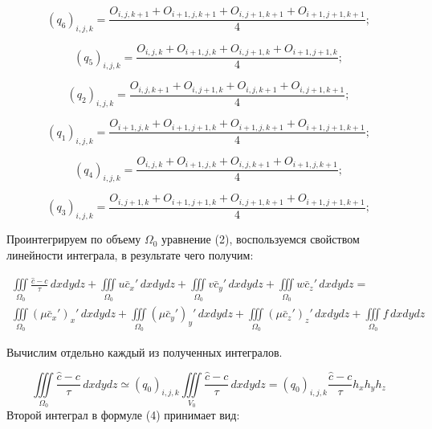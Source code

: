 \documentclass[12pt]{article}
\begin{document}
\begin{equation*}
 (q_6)_{i,j,k}=\frac{O_{i,j,k+1}+O_{i+1,j,k+1}+O_{i,j+1,k+1}+O_{i+1,j+1,k+1}}{4};
\end{equation*}

\begin{equation*}
(q_5)_{i,j,k}=\frac{O_{i,j,k}+O_{i+1,j,k}+O_{i,j+1,k}+O_{i+1,j+1,k}}{4};
\end{equation*}

\begin{equation*}
(q_2)_{i,j,k}=\frac{O_{i,j,k+1}+O_{i,j+1,k}+O_{i,j,k+1}+O_{i,j+1,k+1}}{4};
\end{equation*}

\begin{equation*}
(q_1)_{i,j,k}=\frac{O_{i+1,j,k}+O_{i+1,j+1,k}+O_{i+1,j,k+1}+O_{i+1,j+1,k+1}}{4};
\end{equation*}

\begin{equation*}
(q_4)_{i,j,k}=\frac{O_{i,j,k}+O_{i+1,j,k}+O_{i,j,k+1}+O_{i+1,j,k+1}}{4};
\end{equation*}

\begin{equation*}
(q_3)_{i,j,k}=\frac{O_{i,j+1,k}+O_{i+1,j+1,k}+O_{i,j+1,k+1}+O_{i+1,j+1,k+1}}{4};
\end{equation*}

Проинтегрируем по объему $\Omega_0$ уравнение (2), воспользуемся свойством линейности интеграла, в результате чего получим:

\begin{multline}
\iiint\limits_{\Omega_0} \frac{\hat c - c}{\tau}\,dxdydz + \iiint\limits_{\Omega_0} u\bar{c}_x'\,dxdydz + \iiint\limits_{\Omega_0} v\bar{c}_y'\,dxdydz + \iiint\limits_{\Omega_0} w\bar{c}_z'\,dxdydz = \\
\iiint\limits_{\Omega_0} (\mu\bar{c}_x')_x'\,dxdydz + \iiint\limits_{\Omega_0} (\mu\bar{c}_y')_y'\,dxdydz + \iiint\limits_{\Omega_0} (\mu\bar{c}_z')_z'\,dxdydz + \iiint\limits_{\Omega_0} f\,dxdydz  
\end{multline}

Вычислим отдельно каждый из полученных интегралов.

\begin{equation}
	\iiint\limits_{\Omega_0} \frac{\hat c - c}{\tau}\,dxdydz \simeq (q_0)_{i,j,k}\iiint\limits_{V_0} \frac{\hat c - c}{\tau}\,dxdydz = (q_0)_{i,j,k}\frac{\hat c - c}{\tau}h_xh_yh_z
\end{equation}
Второй интеграл в формуле (4) принимает вид:
\end{document}
